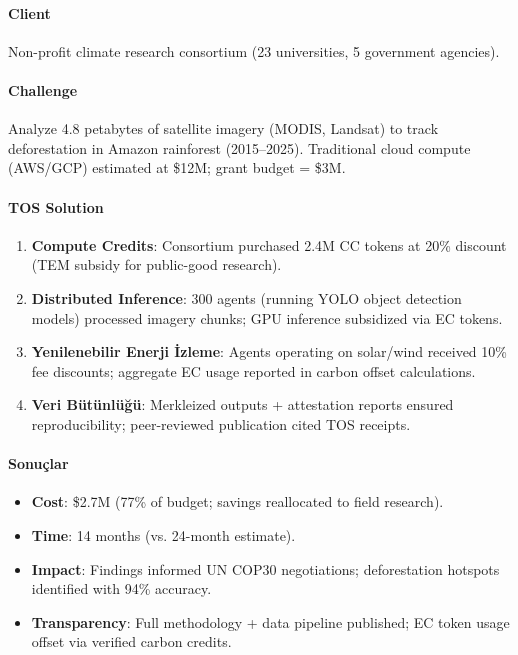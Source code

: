 \documentclass[11pt]{article}
\begin{document}
\begin{itemize}[noitemsep]
\begin{itemize}[noitemsep]
\begin{itemize}[noitemsep]
\begin{itemize}[noitemsep]
\begin{itemize}[noitemsep]
\begin{itemize}[noitemsep]
\begin{itemize}[noitemsep]
\begin{enumerate}[noitemsep]
\begin{itemize}[noitemsep]
\paragraph{Client} Non-profit climate research consortium (23 universities, 5 government agencies).

\paragraph{Challenge} Analyze 4.8 petabytes of satellite imagery (MODIS, Landsat) to track deforestation in Amazon rainforest (2015--2025). Traditional cloud compute (AWS/GCP) estimated at \$12M; grant budget = \$3M.

\paragraph{TOS Solution}
\begin{enumerate}[noitemsep]
  \item \textbf{Compute Credits}: Consortium purchased 2.4M CC tokens at 20\% discount (TEM subsidy for public-good research).
  \item \textbf{Distributed Inference}: 300 agents (running YOLO object detection models) processed imagery chunks; GPU inference subsidized via EC tokens.
  \item \textbf{Yenilenebilir Enerji İzleme}: Agents operating on solar/wind received 10\% fee discounts; aggregate EC usage reported in carbon offset calculations.
  \item \textbf{Veri Bütünlüğü}: Merkleized outputs + attestation reports ensured reproducibility; peer-reviewed publication cited TOS receipts.
\end{enumerate}

\paragraph{Sonuçlar}
\begin{itemize}[noitemsep]
  \item \textbf{Cost}: \$2.7M (77\% of budget; savings reallocated to field research).
  \item \textbf{Time}: 14 months (vs. 24-month estimate).
  \item \textbf{Impact}: Findings informed UN COP30 negotiations; deforestation hotspots identified with 94\% accuracy.
  \item \textbf{Transparency}: Full methodology + data pipeline published; EC token usage offset via verified carbon credits.
\end{itemize}


\end{itemize}
\end{enumerate}
\end{itemize}
\end{itemize}
\end{itemize}
\end{itemize}
\end{itemize}
\end{itemize}
\end{itemize}
\end{document}
